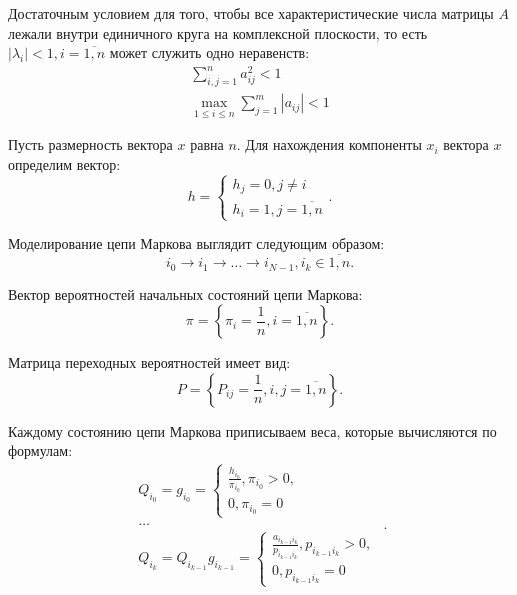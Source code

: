 Достаточным условием для того, чтобы все характеристические числа матрицы $A$ лежали внутри единичного круга на комплексной плоскости, то есть $|\lambda_{i}| < 1, i = \overline{1, n}$ может служить одно неравенств:
\begin{equation}
	\begin{array}{l}
		\sum\limits_{i,j=1}^{n}a_{ij}^{2} < 1\\
		\max\limits_{1 \leqslant i \leqslant n}\sum\limits_{j=1}^{m}|a_{ij}|<1
	\end{array}
\end{equation}

Пусть размерность вектора $x$ равна $n$. Для нахождения компоненты $x_{i}$ вектора $x$ определим вектор:
\begin{equation}
	h=\begin{cases}
		h_{j}=0, j \neq i \\
		h_{i}=1, j = \overline{1,n}
	\end{cases}.
\end{equation}

Моделирование цепи Маркова выглядит следующим образом:
\begin{equation}
i_{0} \rightarrow i_{1} \rightarrow \ldots \rightarrow i_{N-1}, i_{k} \in {\overline{1,n}}.
\end{equation}

Вектор вероятностей начальных состояний цепи Маркова:
\begin{equation}
\pi = \left\lbrace\pi_{i} = \frac{1}{n}, i = \overline{1,n} \right\rbrace.
\end{equation}

Матрица переходных вероятностей имеет вид:
\begin{equation}
P = \left\lbrace P_{ij} = \frac{1}{n}, i,j = \overline{1,n} \right\rbrace.
\end{equation}

Каждому состоянию цепи Маркова приписываем веса, которые вычисляются по формулам:
\begin{equation}
\begin{array}{l}
	Q_{i_{0}}=g_{i_{0}}=\begin{cases}
							\frac{h_{i_{0}}}{\pi_{i_{0}}}, \pi_{i_{0}} > 0, \\
							0, \pi_{i_{0}} = 0
						\end{cases}\\
	\ldots \\
	Q_{i_{k}}=Q_{i_{k-1}}g_{i_{k-1}}=\begin{cases}
										\frac{a_{i_{k-1}i_{k}}}{p_{i_{k-1}i_{k}}}, p_{i_{k-1}i_{k}} > 0,\\
										0, p_{i_{k-1}i_{k}} = 0
									 \end{cases}
\end{array}.
\end{equation}

